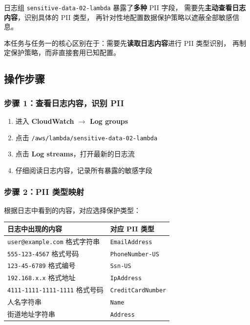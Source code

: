 \documentclass[12pt, a4paper]{article}
\begin{document}
日志组 \texttt{sensitive-data-02-lambda} 暴露了\textbf{多种} PII 字段，
需要先\textbf{主动查看日志内容}，识别具体的 PII 类型，
再针对性地配置数据保护策略以遮蔽全部敏感信息。

\begin{warnbox}
  本任务与任务一的核心区别在于：需要先\textbf{读取日志内容}进行 PII 类型识别，
  再制定保护策略，而非直接套用已知配置。
\end{warnbox}

\subsection{操作步骤}

\subsubsection{步骤 1：查看日志内容，识别 PII}

\begin{enumerate}[leftmargin=2em]
  \item 进入 \textbf{CloudWatch $\rightarrow$ Log groups}
  \item 点击 \texttt{/aws/lambda/sensitive-data-02-lambda}
  \item 点击 \textbf{Log streams}，打开最新的日志流
  \item 仔细阅读日志内容，记录所有暴露的敏感字段
\end{enumerate}

\subsubsection{步骤 2：PII 类型映射}

根据日志中看到的内容，对应选择保护类型：

\begin{center}
\begin{tabular}{@{}ll@{}}
\toprule
\textbf{日志中出现的内容} & \textbf{对应 PII 类型} \\
\midrule
\texttt{user@example.com} 格式字符串 & \texttt{EmailAddress} \\
\texttt{555-123-4567} 格式号码       & \texttt{PhoneNumber-US} \\
\texttt{123-45-6789} 格式编号        & \texttt{Ssn-US} \\
\texttt{192.168.x.x} 格式地址        & \texttt{IpAddress} \\
\texttt{4111-1111-1111-1111} 格式号码 & \texttt{CreditCardNumber} \\
人名字符串                            & \texttt{Name} \\
街道地址字符串                        & \texttt{Address} \\
\bottomrule
\end{tabular}
\end{center}
\end{document}
